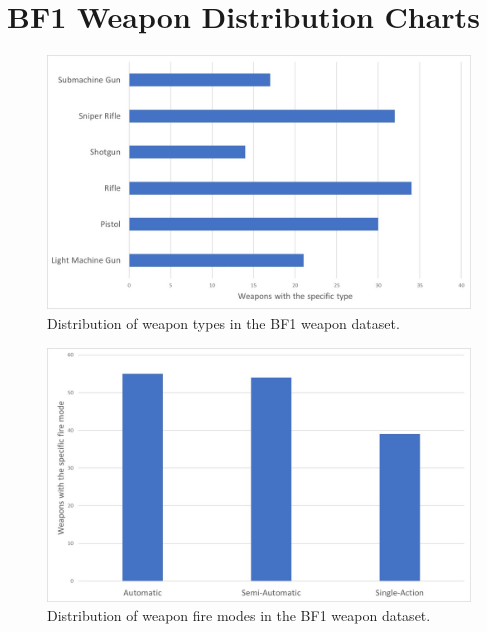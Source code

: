 \documentclass[MGS,Master,english]{twbook}%
\begin{document}
\chapter{\acl{BF1} Weapon Distribution Charts} \label{bf1::data::distributionCharts}
\begin{figure}[!ht]
	\centering
	\includegraphics[width=0.8\linewidth]{PICs/weapon_type_distribution_chart}
	\caption{Distribution of weapon types in the \ac{BF1} weapon dataset.}
\end{figure}
\begin{figure}[!ht]
	\centering
	\includegraphics[width=0.8\linewidth]{PICs/weapon_fire_mode_distribution_chart}
	\caption{Distribution of weapon fire modes in the \ac{BF1} weapon dataset.}
\end{figure}
\end{document}

